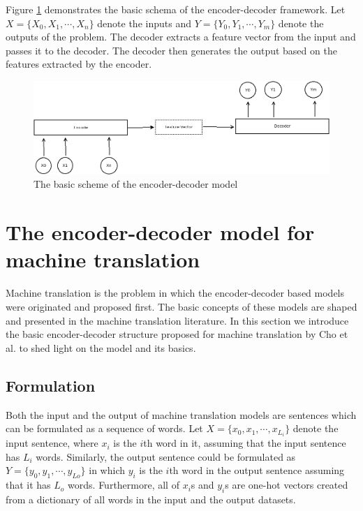 \documentclass[preprint, 10pt]{elsarticle}
\begin{document}
		Figure \ref{fig:encdec} demonstrates the basic schema of the encoder-decoder framework. Let $X = \{X_0, X_1, \cdots, X_n\}$ denote the inputs and $Y = \{Y_0, Y_1, \cdots, Y_m\}$ denote the outputs of the problem. The decoder extracts a feature vector from the input and passes it to the decoder. The decoder then generates the output based on the features extracted by the encoder.
		\begin{figure}[h]
			\centering
			\includegraphics[scale=0.4]{Imgs/encoder_decoder.png}
			\caption{The basic scheme of the encoder-decoder model}
			\label{fig:encdec}
		\end{figure}
		
		
	
	\section{The encoder-decoder model for machine translation}
	Machine translation is the problem in which the encoder-decoder based models were originated and proposed first. The basic concepts of these models are shaped and presented in the machine translation literature. In this section we introduce the basic encoder-decoder structure proposed for machine translation by Cho et al. \cite{cho2014learning} to shed light on the model and its basics.
	
		\subsection{Formulation}
		Both the input and the output of machine translation models are sentences which can be formulated as a sequence of words. Let $X = \{x_0, x_1, \cdots, x_{L_{i}}\}$ denote the input sentence, where $x_i$ is the $i$th word in it, assuming that the input sentence has $L_{i}$ words. Similarly, the output sentence could be formulated as $Y = \{y_0, y_1, \cdots, y_{L{o}}\}$ in which $y_i$ is the $i$th word in the output sentence assuming that it has $L_{o}$ words. Furthermore, all of $x_i$s and $y_i$s are one-hot vectors created from a dictionary of all words in the input and the output datasets.
		
\end{document}
